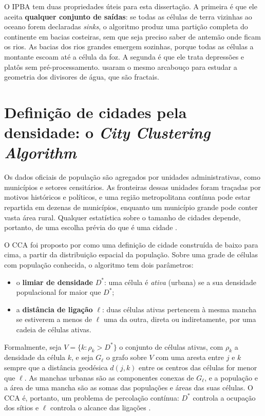 O IPBA tem duas propriedades úteis para esta dissertação. A primeira é que ele aceita \textbf{qualquer conjunto de saídas}: se todas as células de terra vizinhas ao oceano forem declaradas \textit{sinks}, o algoritmo produz uma partição completa do continente em bacias costeiras, sem que seja preciso saber de antemão onde ficam os rios. As bacias dos rios grandes emergem sozinhas, porque todas as células a montante escoam até a célula da foz. A segunda é que ele trata depressões e platôs sem pré-processamento.  usaram o mesmo arcabouço para estudar a geometria dos divisores de água, que são fractais.

\section{Definição de cidades pela densidade: o \textit{City Clustering Algorithm}}
\label{sec:cca}

Os dados oficiais de população são agregados por unidades administrativas, como municípios e setores censitários. As fronteiras dessas unidades foram traçadas por motivos históricos e políticos, e uma região metropolitana contínua pode estar repartida em dezenas de municípios, enquanto um município grande pode conter vasta área rural. Qualquer estatística sobre o tamanho de cidades depende, portanto, de uma escolha prévia do que é uma cidade \cite{rozenfeld2011,arcaute2015}.

O \gls{CCA} foi proposto por  como uma definição de cidade construída de baixo para cima, a partir da distribuição espacial da população. Sobre uma grade de células com população conhecida, o algoritmo tem dois parâmetros:

\begin{itemize}
	\item o \textbf{limiar de densidade} $D^{*}$: uma célula é \textit{ativa} (urbana) se a sua densidade populacional for maior que $D^{*}$;
	\item a \textbf{distância de ligação} $\ell$: duas células ativas pertencem à mesma mancha se estiverem a menos de $\ell$ uma da outra, direta ou indiretamente, por uma cadeia de células ativas.
\end{itemize}

Formalmente, seja $V = \{k : \rho_k > D^{*}\}$ o conjunto de células ativas, com $\rho_k$ a densidade da célula $k$, e seja $G_\ell$ o grafo sobre $V$ com uma aresta entre $j$ e $k$ sempre que a distância geodésica $d(j,k)$ entre os centros das células for menor que $\ell$. As manchas urbanas são as componentes conexas de $G_\ell$, e a população e a área de uma mancha são as somas das populações e áreas das suas células. O CCA é, portanto, um problema de percolação contínua: $D^{*}$ controla a ocupação dos sítios e $\ell$ controla o alcance das ligações \cite{rozenfeld2008,rozenfeld2011}.


